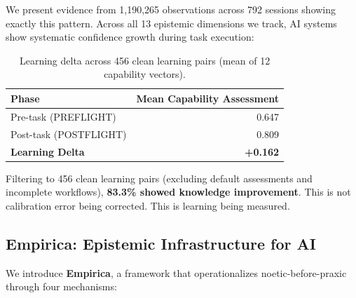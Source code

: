 We present evidence from 1,190,265 observations across 792 sessions showing exactly this pattern. Across all 13 epistemic dimensions we track, AI systems show systematic confidence growth during task execution:

\begin{table}[h]
\centering
\begin{tabular}{lr}
\toprule
\textbf{Phase} & \textbf{Mean Capability Assessment} \\
\midrule
Pre-task (PREFLIGHT) & 0.647 \\
Post-task (POSTFLIGHT) & 0.809 \\
\textbf{Learning Delta} & \textbf{+0.162} \\
\bottomrule
\end{tabular}
\caption{Learning delta across 456 clean learning pairs (mean of 12 capability vectors).}
\label{tab:learning-delta-intro}
\end{table}

Filtering to 456 clean learning pairs (excluding default assessments and incomplete workflows), \textbf{83.3\% showed knowledge improvement}. This is not calibration error being corrected. This is learning being measured.

\subsection{Empirica: Epistemic Infrastructure for AI}

We introduce \textbf{Empirica}, a framework that operationalizes noetic-before-praxic through four mechanisms:


